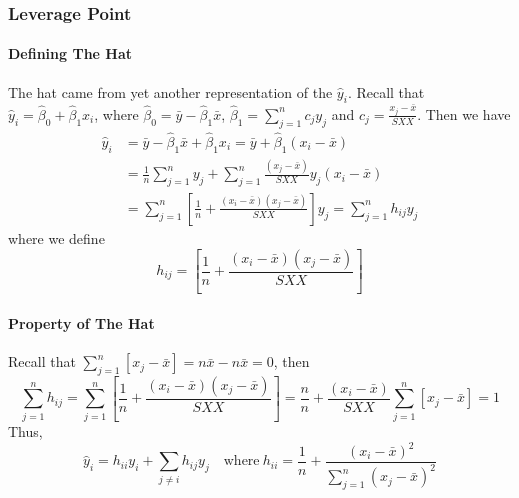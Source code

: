 \documentclass[11pt]{article}
\begin{document}
\subsubsection{Leverage Point}
\paragraph{Defining The Hat}
The hat came from yet another representation of the $\hat{y}_i$. Recall that $\hat{y}_{i}=\hat{\beta}_{0}+\hat{\beta}_{1} x_{i}$, where $\hat{\beta}_{0}=\bar{y}-\hat{\beta}_{1} \bar{x}$, $\hat{\beta}_{1}=\sum_{j=1}^{n} c_{j} y_{j}$ and $c_{j}=\frac{x_{j}-\bar{x}}{S X X}$.
Then we have
\begin{align*}
    \hat{y}_{i}
    &=\bar{y}-\hat{\beta}_{1} \bar{x}+\hat{\beta}_{1} x_{i} 
    =\bar{y}+\hat{\beta}_{1}\left(x_{i}-\bar{x}\right) \\
    &=\frac{1}{n} \sum_{j=1}^{n} y_{j}+\sum_{j=1}^{n} \frac{\left(x_{j}-\bar{x}\right)}{S X X} y_{j}\left(x_{i}-\bar{x}\right) \\
    &=\sum_{j=1}^{n}\left[\frac{1}{n}+\frac{\left(x_{i}-\bar{x}\right)\left(x_{j}-\bar{x}\right)}{S X X}\right] y_{j} 
    =\sum_{j=1}^{n} h_{i j} y_{j}
\end{align*}
where we define
\begin{equation*}
    h_{i j}=\left[\frac{1}{n}+\frac{\left(x_{i}-\bar{x}\right)\left(x_{j}-\bar{x}\right)}{S X X}\right]
\end{equation*}
\paragraph{Property of The Hat}
Recall that $\sum_{j=1}^{n}\left[x_{j}-\bar{x}\right]=n\bar{x} - n\bar{x}=0$, then
\begin{equation*}
    \sum_{j=1}^{n} h_{i j}=\sum_{j=1}^{n}\left[\frac{1}{n}+\frac{\left(x_{i}-\bar{x}\right)\left(x_{j}-\bar{x}\right)}{S X X}\right]=\frac{n}{n}+\frac{\left(x_{i}-\bar{x}\right)}{S X X} \sum_{j=1}^{n}\left[x_{j}-\bar{x}\right]=1
\end{equation*}
Thus,
\begin{equation*}
    \hat{y}_{i}=h_{i i} y_{i}+\sum_{j \neq i} h_{i j} y_{j} \quad \text{where}~h_{i i}=\frac{1}{n}+\frac{\left(x_{i}-\bar{x}\right)^{2}}{\sum_{j=1}^{n}\left(x_{j}-\bar{x}\right)^{2}}
\end{equation*}
\end{document}
